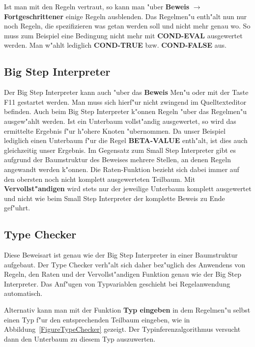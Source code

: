 Ist man mit den Regeln vertraut, so kann man "uber {\bf Beweis}
$\rightarrow$ {\bf Fortgeschrittener} einige Regeln ausblenden. Das
Regelmen"u enth"alt nun nur noch Regeln, die spezifizieren was getan
werden soll und nicht mehr genau wo. So muss zum Beispiel eine
Bedingung nicht mehr mit {\bf COND-EVAL} ausgewertet werden. Man 
w"ahlt lediglich {\bf COND-TRUE} bzw. {\bf COND-FALSE} aus.

\subsection{Big Step Interpreter}
Der Big Step Interpreter kann auch "uber das {\bf Beweis} Men"u oder
mit der Taste F11 gestartet werden. Man muss sich
hierf"ur nicht zwingend im Quelltexteditor befinden. Auch beim
Big Step Interpreter k"onnen Regeln "uber das Regelmen"u ausgew"ahlt
werden. Ist ein Unterbaum vollst"andig ausgewertet, so wird das
ermittelte Ergebnis f"ur h"ohere Knoten "ubernommen. Da unser
Beispiel lediglich einen Unterbaum f"ur die Regel {\bf BETA-VALUE}
enth"alt, ist dies auch gleichzeitig unser Ergebnis. Im Gegensatz
zum Small Step Interpreter gibt es aufgrund der Baumstruktur des
Beweises mehrere Stellen, an denen Regeln angewandt werden k"onnen.
Die Raten-Funktion bezieht sich dabei immer auf den obersten noch
nicht komplett ausgewerteten Teilbaum. Mit {\bf Vervollst"andigen}
wird stets nur der jeweilige Unterbaum komplett ausgewertet und
nicht wie beim Small Step Interpreter der komplette Beweis zu Ende
gef"uhrt.

\subsection{Type Checker}

Diese Beweisart ist genau wie der Big Step Interpreter in einer
Baumstruktur aufgebaut. Der Type Checker verh"alt sich daher
bez"uglich des Anwendens von Regeln, den Raten und der
Vervollst"andigen Funktion genau wie der Big Step Interpreter. Das
Anf"ugen von Typvariablen geschieht bei Regelanwendung automatisch.

Alternativ kann man mit der Funktion {\bf Typ eingeben} in dem
Regelmen"u selbst einen Typ f"ur den entsprechenden Teilbaum
eingeben, wie in Abbildung~\ref{FigureTypeChecker} gezeigt.
Der Typinferenzalgorithmus versucht dann den Unterbaum zu
diesem Typ auszuwerten.

